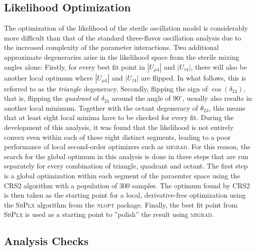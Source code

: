 \subsection{Likelihood Optimization}
The optimization of the likelihood of the sterile oscillation model is considerably more difficult than that of the standard three-flavor oscillation analysis due to the increased complexity of the parameter interactions. Two additional approximate degeneracies arise in the likelihood space from the sterile mixing angles alone: Firstly, for every best fit point in $|U_{\mu 4}|$ and $|U_{\tau 4}|$, there will also be another local optimum where $|U_{\mu 4}|$ and $|U_{\tau 4}|$ are flipped. In what follows, this is referred to as the \emph{triangle} degeneracy. Secondly, flipping the sign of $\cos(\delta_{24})$, that is, flipping the \emph{quadrant} of $\delta_{24}$ around the angle of $90^\circ$, usually also results in another local minimum. Together with the octant degeneracy of $\theta_{23}$, this means that at least eight local minima have to be checked for every fit. During the development of this analysis, it was found that the likelihood is not entirely convex even within each of these eight distinct segments, leading to a poor performance of local second-order optimizers such as \textsc{migrad}\cite{minuit-algo}. For this reason, the search for the global optimum in this analysis is done in three steps that are run separately for every combination of triangle, quadrant and octant. The first step is a global optimization within each segment of the paraemter space using the CRS2\cite{crs2} algorithm with a population of 300 samples. The optimum found by CRS2 is then taken as the starting point for a local, derivative-free optimization using the \textsc{SbPlx}\cite{subplex} algorithm from the \textsc{nlopt}\cite{nlopt} package. Finally, the best fit point from  \textsc{SbPlx} is used as a starting point to ''polish'' the result using \textsc{migrad}\cite{minuit-algo}. 

\subsection{Analysis Checks}

